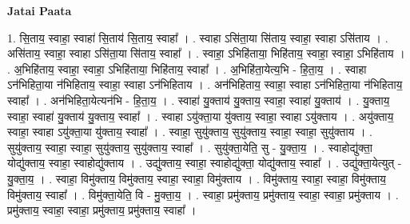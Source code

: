 \documentclass[17pt]{extarticle}
\begin{document}
\textbf{Jatai Paata} \newline

1. सि॒ताय॒ स्वाहा॒ स्वाहा॑ सि॒ताय॑ सि॒ताय॒ स्वाहा᳚ । . स्वाहा ऽसि॑ता॒या सि॑ताय॒ स्वाहा॒ स्वाहा ऽसि॑ताय । . असि॑ताय॒ स्वाहा॒ स्वाहा ऽसि॑ता॒या सि॑ताय॒ स्वाहा᳚ । . स्वाहा॒ ऽभिहि॑ताया॒ भिहि॑ताय॒ स्वाहा॒ स्वाहा॒ ऽभिहि॑ताय । . अ॒भिहि॑ताय॒ स्वाहा॒ स्वाहा॒ ऽभिहि॑ताया॒ भिहि॑ताय॒ स्वाहा᳚ । . अ॒भिहि॑ता॒येत्य॒भि - हि॒ता॒य॒ । . स्वाहा ऽन॑भिहिता॒या न॑भिहिताय॒ स्वाहा॒ स्वाहा ऽन॑भिहिताय । . अन॑भिहिताय॒ स्वाहा॒ स्वाहा ऽन॑भिहिता॒या न॑भिहिताय॒ स्वाहा᳚ । . अन॑भिहिता॒येत्यन॑भि - हि॒ता॒य॒ । . स्वाहा॑ यु॒क्ताय॑ यु॒क्ताय॒ स्वाहा॒ स्वाहा॑ यु॒क्ताय॑ । . यु॒क्ताय॒ स्वाहा॒ स्वाहा॑ यु॒क्ताय॑ यु॒क्ताय॒ स्वाहा᳚ । . स्वाहा ऽयु॑क्ता॒या यु॑क्ताय॒ स्वाहा॒ स्वाहा ऽयु॑क्ताय । . अयु॑क्ताय॒ स्वाहा॒ स्वाहा ऽयु॑क्ता॒या यु॑क्ताय॒ स्वाहा᳚ । . स्वाहा॒ सुयु॑क्ताय॒ सुयु॑क्ताय॒ स्वाहा॒ स्वाहा॒ सुयु॑क्ताय । . सुयु॑क्ताय॒ स्वाहा॒ स्वाहा॒ सुयु॑क्ताय॒ सुयु॑क्ताय॒ स्वाहा᳚ । . सुयु॑क्ता॒येति॒ सु - यु॒क्ता॒य॒ । . स्वाहोद्यु॑क्ता॒ योद्यु॑क्ताय॒ स्वाहा॒ स्वाहोद्यु॑क्ताय । . उद्यु॑क्ताय॒ स्वाहा॒ स्वाहोद्यु॑क्ता॒ योद्यु॑क्ताय॒ स्वाहा᳚ । . उद्यु॑क्ता॒येत्युत् - यु॒क्ता॒य॒ । . स्वाहा॒ विमु॑क्ताय॒ विमु॑क्ताय॒ स्वाहा॒ स्वाहा॒ विमु॑क्ताय । . विमु॑क्ताय॒ स्वाहा॒ स्वाहा॒ विमु॑क्ताय॒ विमु॑क्ताय॒ स्वाहा᳚ । . विमु॑क्ता॒येति॒ वि - मु॒क्ता॒य॒ । . स्वाहा॒ प्रमु॑क्ताय॒ प्रमु॑क्ताय॒ स्वाहा॒ स्वाहा॒ प्रमु॑क्ताय । . प्रमु॑क्ताय॒ स्वाहा॒ स्वाहा॒ प्रमु॑क्ताय॒ प्रमु॑क्ताय॒ स्वाहा᳚ । \newline
\end{document}
